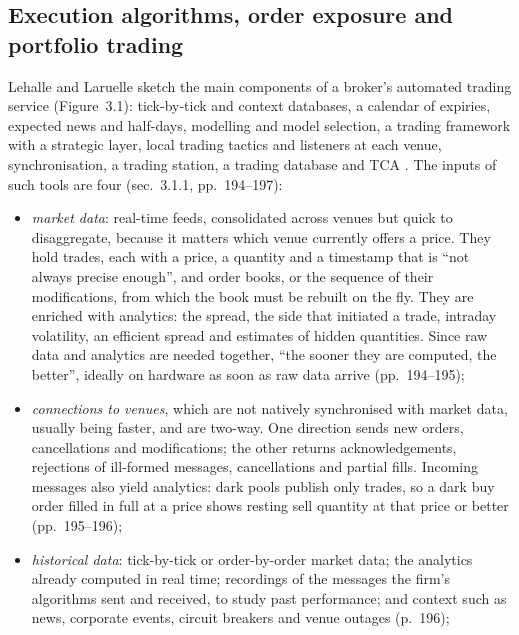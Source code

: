 \subsection{Execution algorithms, order exposure and portfolio trading}

\begin{qfdefinition}\label{def:automated-trading-architecture}
 Lehalle and Laruelle sketch the main components of a broker's automated trading service (Figure~3.1): tick-by-tick and context databases, a calendar of expiries, expected news and half-days, modelling and model selection, a trading framework with a strategic layer, local trading tactics and listeners at each venue, synchronisation, a trading station, a trading database and TCA \citep[sec.~3.1, pp.~193--194]{alpha-laruelle}. The inputs of such tools are four (sec.~3.1.1, pp.~194--197):
\begin{itemize}
\item \emph{market data}: real-time feeds, consolidated across venues but quick to disaggregate, because it matters which venue currently offers a price. They hold trades, each with a price, a quantity and a timestamp that is ``not always precise enough'', and order books, or the sequence of their modifications, from which the book must be rebuilt on the fly. They are enriched with analytics: the spread, the side that initiated a trade, intraday volatility, an efficient spread and estimates of hidden quantities. Since raw data and analytics are needed together, ``the sooner they are computed, the better'', ideally on hardware as soon as raw data arrive (pp.~194--195);
\item \emph{connections to venues}, which are not natively synchronised with market data, usually being faster, and are two-way. One direction sends new orders, cancellations and modifications; the other returns acknowledgements, rejections of ill-formed messages, cancellations and partial fills. Incoming messages also yield analytics: dark pools publish only trades, so a dark buy order filled in full at a price shows resting sell quantity at that price or better (pp.~195--196);
\item \emph{historical data}: tick-by-tick or order-by-order market data; the analytics already computed in real time; recordings of the messages the firm's algorithms sent and received, to study past performance; and context such as news, corporate events, circuit breakers and venue outages (p.~196);

\end{itemize}
\end{qfdefinition}
